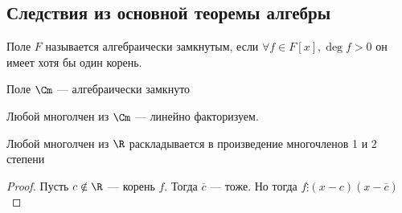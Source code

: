 \subsection{Следствия из основной теоремы алгебры}
\begin{definition}
    Поле \(F\) называется алгебраически замкнутым, если \(\forall f \in F[x], \deg f > 0\) он имеет хотя бы один корень.
\end{definition}
\begin{corollary}
    Поле \(\Cm\) --- алгебраически замкнуто
\end{corollary}
\begin{corollary}
    Любой многолчен из \(\Cm\) --- линейно факторизуем.
\end{corollary}
\begin{corollary}
    Любой многолчен из \(\R\) раскладывается в произведение многочленов 1 и 2 степени
\end{corollary}
\begin{proof}
    Пусть \(c \notin \R\) --- корень \(f\). Тогда \(\overline{c}\) --- тоже. Но тогда \(f \vdots (x - c)(x - \overline{c})\)
\end{proof}

